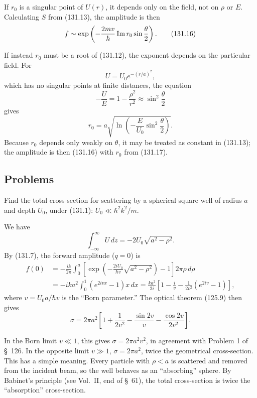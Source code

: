 If $r_0$ is a singular point of $U(r)$, it depends only on the field, not on
$\rho$ or $E$. Calculating $S$ from (131.13), the amplitude is then
\begin{equation}
 f\sim\exp\left(-\frac{2mv}{\hbar}\mathop{\rm Im}r_0
 \sin\frac\theta2\right).
 \tag{131.16}
\end{equation}

If instead $r_0$ must be a root of (131.12), the exponent depends on the
particular field. For
\[
 U=U_0e^{-(r/a)^2},
\]
which has no singular points at finite distances, the equation
\[
 -\frac UE=1-\frac{\rho^2}{r^2}\approx\sin^2\frac\theta2
\]
gives
\begin{equation}
 r_0=a\sqrt{\ln\left(-\frac{E}{U_0}\sin^2\frac\theta2\right)}.
 \tag{131.17}
\end{equation}
Because $r_0$ depends only weakly on $\theta$, it may be treated as constant in
(131.13); the amplitude is then (131.16) with $r_0$ from (131.17).

\subsection*{Problems}

 Find the total cross-section for scattering by a spherical
square well of radius $a$ and depth $U_0$, under (131.1):
$U_0\ll\hbar^2k^2/m$.

\SolutionHeading We have
\[
 \int_{-\infty}^{\infty}U\,dz=-2U_0\sqrt{a^2-\rho^2}.
\]
By (131.7), the forward amplitude ($q=0$) is
\[
 \begin{aligned}
 f(0)&=-\frac{ik}{2\pi}\int_0^a
 \left[\exp\left(-\frac{2iU_0}{\hbar v}\sqrt{a^2-\rho^2}\right)-1\right]
 2\pi\rho\,d\rho\\
 &=-ika^2\int_0^1(e^{2ivx}-1)x\,dx
 =\frac{ka^2}{2i}\left[1-\frac{i}{v}
 -\frac1{2v^2}(e^{2iv}-1)\right],
 \end{aligned}
\]
where $v=U_0a/\hbar v$ is the ``Born parameter.'' The optical theorem (125.9)
then gives
\[
 \sigma=2\pi a^2\left[1+\frac1{2v^2}-\frac{\sin2v}{v}
 -\frac{\cos2v}{2v^2}\right].
\]

In the Born limit $v\ll1$, this gives $\sigma=2\pi a^2v^2$, in agreement with
Problem 1 of \S~126. In the opposite limit $v\gg1$,
$\sigma=2\pi a^2$, twice the geometrical cross-section. This has a simple
meaning. Every particle with $\rho<a$ is scattered and removed from the
incident beam, so the well behaves as an ``absorbing'' sphere. By Babinet's
principle (see Vol.~II, end of \S~61), the total cross-section is twice the
``absorption'' cross-section.

